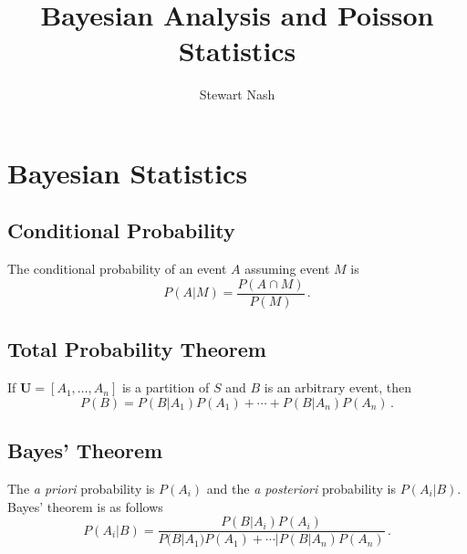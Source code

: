 \documentclass{article}
\begin{document}
	\title{Bayesian Analysis and Poisson Statistics}
	\author{Stewart Nash}
	\maketitle
	\section{Bayesian Statistics}
		\subsection{Conditional Probability}
			The conditional probability of an event $A$ assuming event $M$ is
			\begin{equation}
				P(A|M)=\frac{P(A\cap M)}{P(M)}\,.
			\end{equation}
		\subsection{Total Probability Theorem}
			If $\mathbf{U}=[A_1,\ldots,A_n]$ is a partition of $S$ and $B$ is an arbitrary event, then
			\begin{equation}
				P(B)=P(B|A_1)P(A_1)+\cdots+P(B|A_n)P(A_n)\,.
			\end{equation}
		\subsection{Bayes' Theorem}
			The \emph{a priori} probability is $P(A_i)$ and the \emph{a posteriori} probability is $P(A_i|B)$. Bayes' theorem is as follows
			\begin{equation}
				P(A_i|B)=\frac{P(B|A_i)P(A_i)}{P(B|A_1)P(A_1)+\cdots|P(B|A_n)P(A_n)}\,.
			\end{equation}
\end{document}
